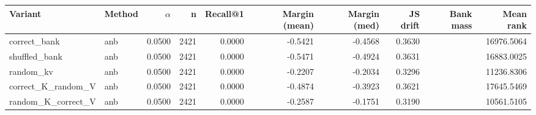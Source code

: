 \begin{tabular}{l l r r r r r r r r}
\toprule
Variant & Method & $\alpha$ & n & Recall@1 & Margin (mean) & Margin (med) & JS drift & Bank mass & Mean rank \\
\midrule
correct\_bank & anb & 0.0500 & 2421 & 0.0000 & -0.5421 & -0.4568 & 0.3630 &  & 16976.5064 \\
shuffled\_bank & anb & 0.0500 & 2421 & 0.0000 & -0.5471 & -0.4924 & 0.3631 &  & 16883.0025 \\
random\_kv & anb & 0.0500 & 2421 & 0.0000 & -0.2207 & -0.2034 & 0.3296 &  & 11236.8306 \\
correct\_K\_random\_V & anb & 0.0500 & 2421 & 0.0000 & -0.4874 & -0.3923 & 0.3621 &  & 17645.5469 \\
random\_K\_correct\_V & anb & 0.0500 & 2421 & 0.0000 & -0.2587 & -0.1751 & 0.3190 &  & 10561.5105 \\
\bottomrule
\end{tabular}
